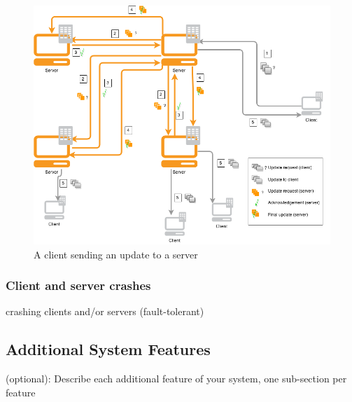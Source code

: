 \begin{figure}[h!]
  \centering
    \includegraphics[width=\textwidth]{diagrams/game-update}
    
  \caption{A client sending an update to a server}
  \label{update_diagram}
\end{figure}

\subsubsection*{Client and server crashes}
crashing clients and/or servers (fault-tolerant)

\subsection{Additional System Features}
(optional): Describe each additional feature of your system, one sub-section per feature
 